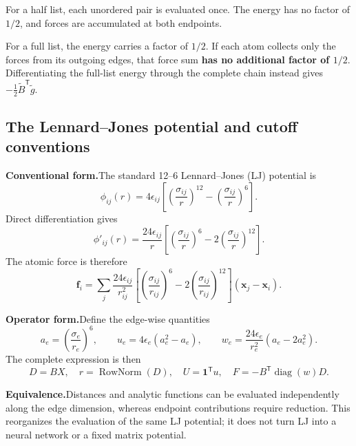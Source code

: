 \documentclass[11pt,a4paper]{article}
\newcommand{\oldform}{\par\noindent\textbf{Conventional form.}\quad}
\newcommand{\newform}{\par\noindent\textbf{Operator form.}\quad}
\newcommand{\parallelmeaning}{\par\noindent\textbf{Equivalence.}\quad}
\newcommand{\ones}{\mathbf 1}
\newcommand{\diag}{\operatorname{diag}}
\newcommand{\vect}[1]{\bm{#1}}
\theoremstyle{definition}
\begin{document}
For a half list, each unordered pair is evaluated once. The energy has no factor of $1/2$, and
forces are accumulated at both endpoints.

For a full list, the energy carries a factor of $1/2$. If each atom collects only the forces
from its outgoing edges, that force sum \textbf{has no additional factor of $1/2$}.
Differentiating the full-list energy through the complete chain instead gives
$-\tfrac12\widetilde B^{\mathsf T}\widetilde g$.


\subsection{The Lennard--Jones potential and cutoff conventions}
\label{sec:lj}
\oldform The standard 12--6 Lennard--Jones (LJ) potential is~\cite{lammps-lj}
\begin{equation}
\phi_{ij}(r)=4\epsilon_{ij}\left[
\left(\frac{\sigma_{ij}}r\right)^{12}
-\left(\frac{\sigma_{ij}}r\right)^6\right].
\label{eq:lj-energy}
\end{equation}
Direct differentiation gives
\begin{equation}
\phi'_{ij}(r)=\frac{24\epsilon_{ij}}r
\left[\left(\frac{\sigma_{ij}}r\right)^6
-2\left(\frac{\sigma_{ij}}r\right)^{12}\right].
\end{equation}
The atomic force is therefore
\begin{equation}
\vect f_i=\sum_j\frac{24\epsilon_{ij}}{r_{ij}^2}
\left[\left(\frac{\sigma_{ij}}{r_{ij}}\right)^6
-2\left(\frac{\sigma_{ij}}{r_{ij}}\right)^{12}\right]
(\vect x_j-\vect x_i).
\label{eq:lj-force-traditional}
\end{equation}

\newform Define the edge-wise quantities
\begin{equation}
a_e=\left(\frac{\sigma_e}{r_e}\right)^6,\qquad
u_e=4\epsilon_e(a_e^2-a_e),\qquad
w_e=\frac{24\epsilon_e}{r_e^2}(a_e-2a_e^2).
\end{equation}
The complete expression is then
\begin{equation}
D=BX,\quad r=\operatorname{RowNorm}(D),\quad
U=\ones^{\mathsf T}u,\quad F=-B^{\mathsf T}\diag(w)D.
\label{eq:lj-force-tensor}
\end{equation}
\parallelmeaning Distances and analytic functions can be evaluated independently along the edge dimension, whereas endpoint contributions require reduction. This reorganizes the evaluation of the same LJ potential; it does not turn LJ into a neural network or a fixed matrix potential.
\end{document}
